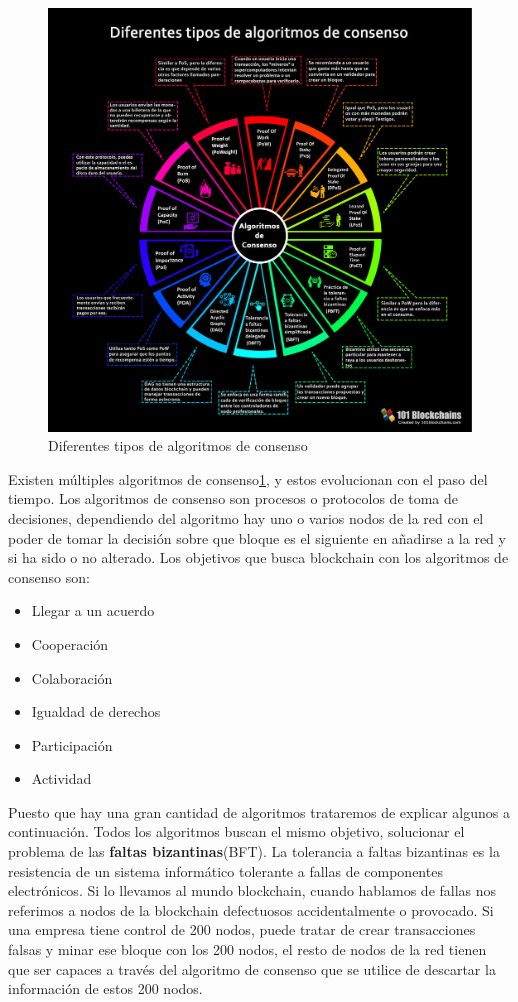 \begin{figure}[h!]
  \centering
  \includegraphics[width=0.8\linewidth]{figs/EstadoArte/Blockchain/algoritmosConsenso.jpeg}
  \caption[Algoritmos de Consenso]{Diferentes tipos de algoritmos de consenso}
  \label{fig:consenso}
\end{figure}

Existen múltiples algoritmos de consenso\ref{fig:consenso}, y estos evolucionan con el paso del tiempo. Los algoritmos de consenso son procesos o protocolos de toma de decisiones, dependiendo del algoritmo hay uno o varios nodos de la red con el poder de tomar la decisión sobre que bloque es el siguiente en añadirse a la red y si ha sido o no alterado. Los objetivos que busca blockchain con los algoritmos de consenso son:

\begin{itemize}
\item Llegar a un acuerdo
\item Cooperación
\item Colaboración
\item Igualdad de derechos
\item Participación
\item Actividad
\end{itemize}

Puesto que hay una gran cantidad de algoritmos trataremos de explicar algunos a continuación\cite{algoConsenso}. Todos los algoritmos buscan el mismo objetivo, solucionar el problema de las \textbf{faltas bizantinas}(BFT)\cite{BFT}. La tolerancia a faltas bizantinas es la resistencia de un sistema informático tolerante a fallas de componentes electrónicos. Si lo llevamos al mundo blockchain, cuando hablamos de fallas nos referimos a nodos de la blockchain defectuosos accidentalmente o provocado. Si una empresa tiene control de 200 nodos, puede tratar de crear transacciones falsas y minar ese bloque con los 200 nodos, el resto de nodos de la red tienen que ser capaces a través del algoritmo de consenso que se utilice de descartar la información de estos 200 nodos.


